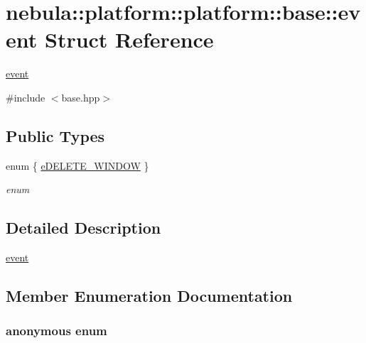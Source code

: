 \hypertarget{structnebula_1_1platform_1_1platform_1_1base_1_1event}{
\section{nebula::platform::platform::base::event Struct Reference}
\label{structnebula_1_1platform_1_1platform_1_1base_1_1event}
}


\hyperlink{structnebula_1_1platform_1_1platform_1_1base_1_1event}{event}  


{\ttfamily \#include $<$base.hpp$>$}\subsection*{Public Types}
\begin{DoxyCompactItemize}
\item 
enum \{ \hyperlink{structnebula_1_1platform_1_1platform_1_1base_1_1event_a05ec8d48215a5f97993bdffbd62730c3ac51a57d4cb92b85020eb5d216e5ae017}{eDELETE\_\-WINDOW}
 \}
\begin{DoxyCompactList}\small\item\em enum \item\end{DoxyCompactList}\end{DoxyCompactItemize}


\subsection{Detailed Description}
\hyperlink{structnebula_1_1platform_1_1platform_1_1base_1_1event}{event} 

\subsection{Member Enumeration Documentation}
\hypertarget{structnebula_1_1platform_1_1platform_1_1base_1_1event_a05ec8d48215a5f97993bdffbd62730c3}{
\subsubsection[{"@4}]{\setlength{\rightskip}{0pt plus 5cm}anonymous enum}}
\label{structnebula_1_1platform_1_1platform_1_1base_1_1event_a05ec8d48215a5f97993bdffbd62730c3}


